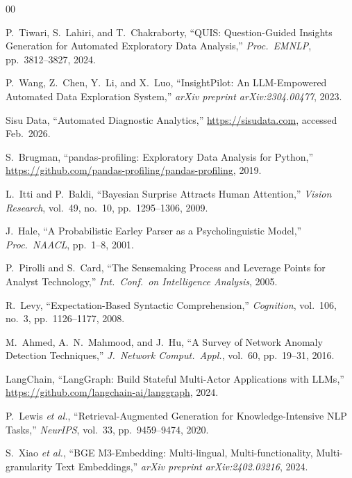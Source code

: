 \documentclass[conference]{IEEEtran}
\begin{document}
\begin{thebibliography}{00}

P.~Tiwari, S.~Lahiri, and T.~Chakraborty,
``QUIS: Question-Guided Insights Generation for Automated Exploratory
Data Analysis,''
\textit{Proc.\ EMNLP}, pp.\ 3812--3827, 2024.

P.~Wang, Z.~Chen, Y.~Li, and X.~Luo,
``InsightPilot: An LLM-Empowered Automated Data Exploration System,''
\textit{arXiv preprint arXiv:2304.00477}, 2023.

Sisu Data,
``Automated Diagnostic Analytics,''
\url{https://sisudata.com}, accessed Feb.\ 2026.

S.~Brugman,
``pandas-profiling: Exploratory Data Analysis for Python,''
\url{https://github.com/pandas-profiling/pandas-profiling}, 2019.

L.~Itti and P.~Baldi,
``Bayesian Surprise Attracts Human Attention,''
\textit{Vision Research}, vol.~49, no.~10, pp.\ 1295--1306, 2009.

J.~Hale,
``A Probabilistic Earley Parser as a Psycholinguistic Model,''
\textit{Proc.\ NAACL}, pp.\ 1--8, 2001.

P.~Pirolli and S.~Card,
``The Sensemaking Process and Leverage Points for Analyst Technology,''
\textit{Int.\ Conf.\ on Intelligence Analysis}, 2005.

R.~Levy,
``Expectation-Based Syntactic Comprehension,''
\textit{Cognition}, vol.~106, no.~3, pp.\ 1126--1177, 2008.

M.~Ahmed, A.~N.~Mahmood, and J.~Hu,
``A Survey of Network Anomaly Detection Techniques,''
\textit{J.\ Network Comput.\ Appl.}, vol.~60, pp.\ 19--31, 2016.

LangChain,
``LangGraph: Build Stateful Multi-Actor Applications with LLMs,''
\url{https://github.com/langchain-ai/langgraph}, 2024.

P.~Lewis \textit{et al.},
``Retrieval-Augmented Generation for Knowledge-Intensive NLP Tasks,''
\textit{NeurIPS}, vol.~33, pp.\ 9459--9474, 2020.

S.~Xiao \textit{et al.},
``BGE M3-Embedding: Multi-lingual, Multi-functionality,
Multi-granularity Text Embeddings,''
\textit{arXiv preprint arXiv:2402.03216}, 2024.


\end{thebibliography}
\end{document}
